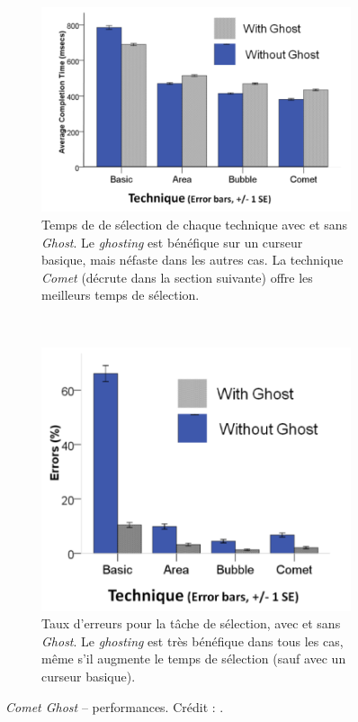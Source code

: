 	\begin{figure}[!htbp]
		\begin{subfigure}[t]{0.49\textwidth}
			\centering
			\includegraphics[width=\textwidth]{figures/ch2/cometGhostTimes}
			\caption{Temps de de sélection de chaque technique avec et sans \emph{Ghost}. Le \emph{ghosting} est bénéfique sur un curseur basique, mais néfaste dans les autres cas. La technique \emph{Comet} (décrute dans la section suivante) offre les meilleurs temps de sélection.}
			\label{fig:cometGhostTimes}
		\end{subfigure}
		~
		\begin{subfigure}[t]{0.49\textwidth}
			\centering
			\includegraphics[width=\textwidth]{figures/ch2/cometGhostErrors}
			\caption{Taux d'erreurs pour la tâche de sélection, avec et sans \emph{Ghost}. Le \emph{ghosting} est très bénéfique dans tous les cas, même s'il augmente le temps de sélection (sauf avec un curseur basique).}
			\label{fig:cometGhostErrors}
		\end{subfigure}
		\caption[\emph{Comet Ghost} -- temps de sélection et taux d'erreurs]{\emph{Comet Ghost} -- performances. Crédit : \cite{hasan2011comet}.}
		\label{fig:cometGhostTimeErrors}
	\end{figure}
		
